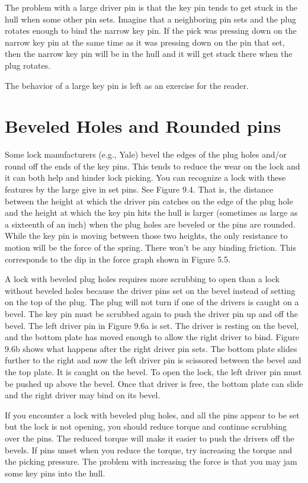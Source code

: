 The problem with a large driver pin is that the key pin tends to get stuck in the hull
when some other pin sets. Imagine that a neighboring pin sets and the plug rotates enough
to bind the narrow key pin. If the pick was pressing down on the narrow key pin at the same
time as it was pressing down on the pin that set, then the narrow key pin will be in the hull
and it will get stuck there when the plug rotates.

The behavior of a large key pin is left as an exercise for the reader.

\section{Beveled Holes and Rounded pins}
Some lock manufacturers (e.g., Yale) bevel the edges of the plug holes and/or round off
the ends of the key pins. This tends to reduce the wear on the lock and it can both help
and hinder lock picking. You can recognize a lock with these features by the large give in
set pins. See Figure 9.4. That is, the distance between the height at which the driver pin
catches on the edge of the plug hole and the height at which the key pin hits the hull is larger
(sometimes as large as a sixteenth of an inch) when the plug holes are beveled or the pins
are rounded. While the key pin is moving between those two heights, the only resistance to
motion will be the force of the spring. There won't be any binding friction. This corresponds
to the dip in the force graph shown in Figure 5.5.

A lock with beveled plug holes requires more scrubbing to open than a lock without
beveled holes because the driver pins set on the bevel instead of setting on the top of the
plug. The plug will not turn if one of the drivers is caught on a bevel. The key pin must
be scrubbed again to push the driver pin up and off the bevel. The left driver pin in Figure
9.6a is set. The driver is resting on the bevel, and the bottom plate has moved enough to
allow the right driver to bind. Figure 9.6b shows what happens after the right driver pin
sets. The bottom plate slides further to the right and now the left driver pin is scissored
between the bevel and the top plate. It is caught on the bevel. To open the lock, the left
driver pin must be pushed up above the bevel. Once that driver is free, the bottom plate can
slide and the right driver may bind on its bevel.

If you encounter a lock with beveled plug holes, and all the pins appear to be set but the
lock is not opening, you should reduce torque and continue scrubbing over the pins. The
reduced torque will make it easier to push the drivers off the bevels. If pins unset when you
reduce the torque, try increasing the torque and the picking pressure. The problem with
increasing the force is that you may jam some key pins into the hull.

